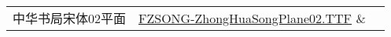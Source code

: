 \documentclass[zihao=-4]{ctexbook}
\newcommand{\qiao}{\char"25062}
\newcommand{\hai}{\char"25050}
\newcommand{\ceng}{\char"22524}
\newcommand{\jiji}{\char"23B20}
\newcommand{\baba}{\char"23B36}
\newcommand{\gua}{\char"24AEB}
\newcommand{\bie}{\char"243F0}
\newcommand{\wu}{\char"206C6}
\newcommand{\qian}{\char"20803}
\newcommand{\bang}{\char"20CD0}
\newcommand{\xixi}{\char"23891}
\begin{document}
{\begin{center}
\begin{tabular}{||c|c|c||}
        \hline
        中华书局宋体02平面          & \href{https://github.com/xiangrongjingujiu/ZhongHuaSongFont/raw/master/                                                                                                                                                        %E4%B8%AD%E5%8D%8E%E4%B9%A6%E5%B1%80%E5%AE%8B%E4%BD%93%E5%AD%97%E5%BA%93/FZSONG_ZhongHuaSongPlane02_2021012120210122112919.TTF}{FZSONG-ZhongHuaSongPlane02.TTF} & {\zhtwo{字体测试 \qiao \hai \ceng \jiji \baba \gua \bie \wu \qian \bang \xixi}}\\
        \hline
    \end{tabular}
\end{center}



}
\end{document}
